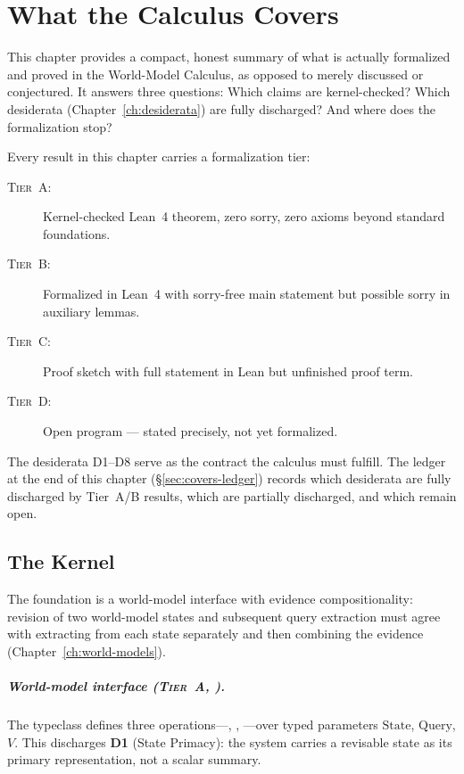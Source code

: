 \chapter{What the Calculus Covers}
\label{ch:covers}

This chapter provides a compact, honest summary of what is actually
formalized and proved in the World-Model Calculus, as opposed to merely
discussed or conjectured.  It answers three questions: Which claims are
kernel-checked?  Which desiderata
(Chapter~\ref{ch:desiderata}) are fully discharged?  And where does the
formalization stop?

Every result in this chapter carries a formalization tier:
\begin{description}
\item[\textsc{Tier~A}:] Kernel-checked Lean~4 theorem, zero sorry, zero
  axioms beyond standard foundations.
\item[\textsc{Tier~B}:] Formalized in Lean~4 with sorry-free main
  statement but possible sorry in auxiliary lemmas.
\item[\textsc{Tier~C}:] Proof sketch with full statement in Lean but
  unfinished proof term.
\item[\textsc{Tier~D}:] Open program --- stated precisely, not yet
  formalized.
\end{description}

\noindent
The desiderata D1--D8 serve as the contract the calculus must
fulfill.  The ledger at the end of this chapter
(\S\ref{sec:covers-ledger}) records which desiderata are fully
discharged by Tier~A/B results, which are partially discharged, and
which remain open.


\section{The Kernel}
\label{sec:covers-kernel}

The foundation is a world-model interface with evidence
compositionality: revision of two world-model states and subsequent
query extraction must agree with extracting from each state separately
and then combining the evidence
(Chapter~\ref{ch:world-models}).

\paragraph{World-model interface (\textsc{Tier~A}, \claimCore{}).}
The  typeclass defines three operations---,
, ---over typed parameters
$\mathrm{State}$, $\mathrm{Query}$, $V$.  This discharges
\textbf{D1} (State Primacy): the system carries a revisable state as its
primary representation, not a scalar summary.

